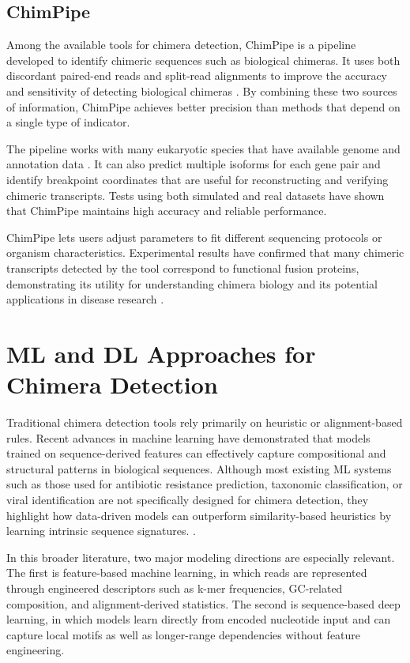 \subsection{ChimPipe}

Among the available tools for chimera detection, ChimPipe is a pipeline developed to identify chimeric sequences such as biological chimeras. It uses both discordant paired-end reads and split-read alignments to improve the accuracy and sensitivity of detecting biological chimeras \citep{Rodriguez2017}. By combining these two sources of information, ChimPipe achieves better precision than methods that depend on a single type of indicator.

The pipeline works with many eukaryotic species that have available genome and annotation data \citep{Rodriguez2017}. It can also predict multiple isoforms for each gene pair and identify breakpoint coordinates that are useful for reconstructing and verifying chimeric transcripts. Tests using both simulated and real datasets have shown that ChimPipe maintains high accuracy and reliable performance.

ChimPipe lets users adjust parameters to fit different sequencing protocols or organism characteristics. Experimental results have confirmed that many chimeric transcripts detected by the tool correspond to functional fusion proteins, demonstrating its utility for understanding chimera biology and its potential applications in disease research \citep{Rodriguez2017}.

\section{ML and DL Approaches for Chimera Detection}

Traditional chimera detection tools rely primarily on heuristic or alignment-based rules. Recent advances in machine learning have demonstrated that models trained on sequence-derived features can effectively capture compositional and structural patterns in biological sequences. Although most existing ML systems such as those used for antibiotic resistance prediction, taxonomic classification, or viral identification are not specifically designed for chimera detection, they highlight how data-driven models can outperform similarity-based heuristics by learning intrinsic sequence signatures. \citep{Arango2018,Liang2020,Ren2020}.

In this broader literature, two major modeling directions are especially relevant. The first is feature-based machine learning, in which reads are represented through engineered descriptors such as k-mer frequencies, GC-related composition, and alignment-derived statistics. The second is sequence-based deep learning, in which models learn directly from encoded nucleotide input and can capture local motifs as well as longer-range dependencies without feature engineering.

